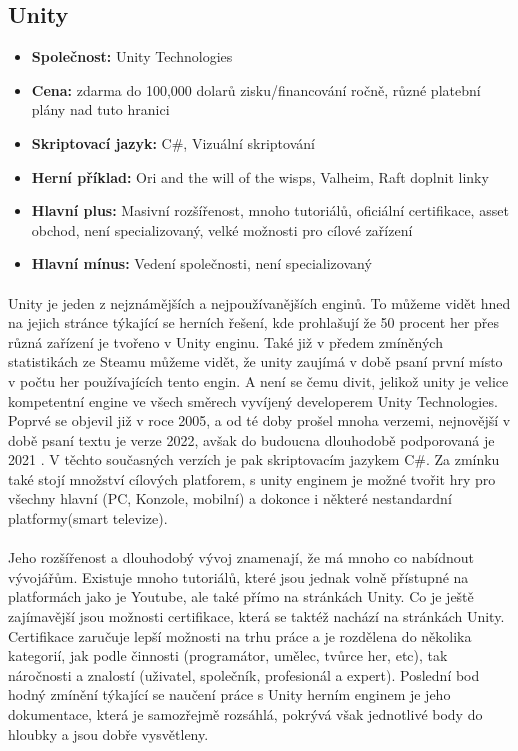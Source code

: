 \subsection{Unity}

	\begin{itemize}
		\item \textbf{Společnost: } Unity Technologies
		\item \textbf{Cena: } zdarma do 100,000 dolarů zisku/financování ročně, různé platební plány nad tuto hranici\cite{unity_pay_plan}
		\item \textbf{Skriptovací jazyk: } C\#, Vizuální skriptování
		\item \textbf{Herní příklad: } Ori and the will of the wisps, Valheim, Raft \todo doplnit linky
		\item \textbf{Hlavní plus: } Masivní rozšířenost, mnoho tutoriálů, oficiální certifikace, asset obchod, není specializovaný, velké možnosti pro cílové zařízení
		\item \textbf{Hlavní mínus: } Vedení společnosti, není specializovaný
	\end{itemize}

\paragraph{}
	Unity\cite{unity_engine} je jeden z nejznámějších a nejpoužívanějších enginů.
	To můžeme vidět hned na jejich stránce týkající se herních řešení, kde prohlašují že 50 procent her přes různá zařízení je tvořeno v Unity enginu.
	Také již v předem zmíněných statistikách ze Steamu\cite{steamdb_engines} můžeme vidět, že unity zaujímá v době psaní první místo v počtu her používajících tento engin.
	A není se čemu divit, jelikož unity je velice kompetentní engine ve všech směrech vyvíjený developerem Unity Technologies.
	Poprvé se objevil již v roce 2005, a od té doby prošel mnoha verzemi,  nejnovější v době psaní textu je verze 2022, avšak do budoucna dlouhodobě podporovaná je 2021 .
	V těchto současných verzích je pak skriptovacím jazykem C\#.
	Za zmínku také stojí množství cílových platforem, s unity enginem je možné tvořit hry pro všechny hlavní (PC, Konzole, mobilní) a dokonce i některé nestandardní platformy(smart televize).

\paragraph{}
	Jeho rozšířenost a dlouhodobý vývoj znamenají, že má mnoho co nabídnout vývojářům.
	Existuje mnoho tutoriálů, které jsou jednak volně přístupné na platformách jako je Youtube, ale také přímo na stránkách Unity.
	Co je ještě zajímavější jsou možnosti certifikace, která se taktéž nachází na stránkách Unity.
	Certifikace zaručuje lepší možnosti na trhu práce a je rozdělena do několika kategorií, jak podle činnosti (programátor, umělec, tvůrce her, etc), tak náročnosti a znalostí (uživatel, společník, profesionál a expert).
	Poslední bod hodný zmínění týkající se naučení práce s Unity herním enginem je jeho dokumentace\cite{unity_doc}, která je samozřejmě rozsáhlá, pokrývá však jednotlivé body do hloubky a jsou dobře vysvětleny.

